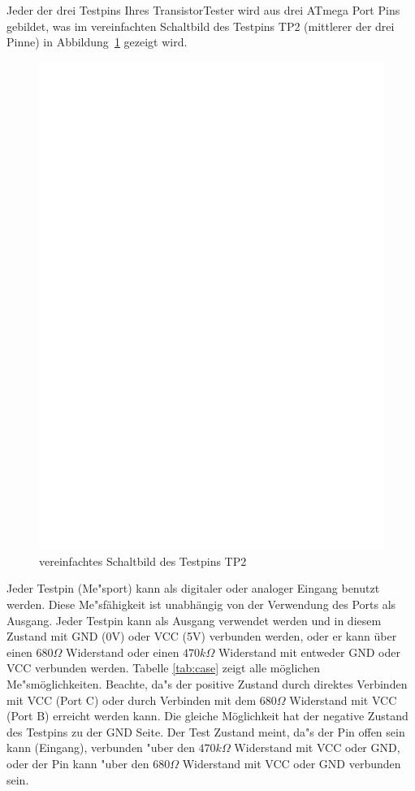 Jeder der drei Testpins Ihres TransistorTester wird aus drei ATmega Port Pins gebildet,
was im vereinfachten Schaltbild des Testpins TP2 (mittlerer der drei Pinne) in Abbildung~\ref{fig:terminal} gezeigt wird.

\begin{figure}[h]
\centering
\includegraphics[]{../FIG/terminal.eps}
\caption{vereinfachtes Schaltbild des Testpins TP2}
\label{fig:terminal}
\end{figure}
Jeder Testpin (Me"sport) kann als digitaler oder analoger Eingang benutzt werden.
Diese Me"s\-f\"ahig\-keit ist un\-abh\"an\-gig von der Verwendung des Ports als Ausgang.
Jeder Testpin kann als Ausgang verwendet werden und in diesem Zustand mit GND (0V) oder VCC (5V) verbunden werden,
oder er kann \"uber einen \(680\Omega\) Widerstand oder einen \(470k\Omega\) Widerstand mit entweder GND oder VCC verbunden werden.
Tabelle \ref{tab:case} zeigt alle m\"oglichen Me"sm\"oglichkeiten.
Beachte, da"s der positive Zustand durch direktes Verbinden mit VCC (Port C) oder
durch Verbinden mit dem \(680\Omega\) Widerstand mit VCC (Port B) erreicht werden kann.
Die gleiche M\"oglichkeit hat der negative Zustand des Testpins zu der GND Seite.
Der Test Zustand meint, da"s der Pin offen sein kann (Eingang), verbunden "uber den \(470k\Omega\) Widerstand
mit VCC oder GND, oder der Pin kann "uber den \(680\Omega\) Widerstand mit VCC oder GND verbunden sein.

